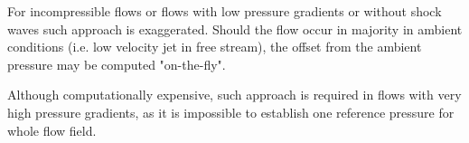 For incompressible flows or flows with low pressure gradients or without shock waves such approach is exaggerated. Should the flow occur in majority in ambient conditions (i.e. low velocity jet in free stream), the offset from the ambient pressure may be computed "on-the-fly".

Although computationally expensive, such approach is required in flows with very high pressure gradients, as it is impossible to establish one reference pressure for whole flow field.






